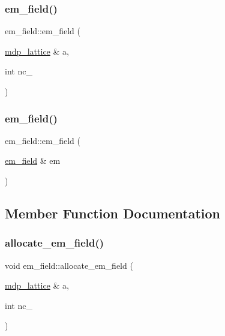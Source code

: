 \mbox{\label{classem__field_a15c0bc41753d8728c251f51b48e0f1ea}} 
\subsubsection{\texorpdfstring{em\+\_\+field()}{em\_field()}\hspace{0.1cm}{\footnotesize\ttfamily [2/3]}}
{\footnotesize\ttfamily em\+\_\+field\+::em\+\_\+field (\begin{DoxyParamCaption}\item[{\hyperlink{classmdp__lattice}{mdp\+\_\+lattice} \&}]{a,  }\item[{int}]{nc\+\_\+ }\end{DoxyParamCaption})\hspace{0.3cm}{\ttfamily [inline]}}

\mbox{\label{classem__field_ab061ffebdbd768362b56121237c1ac80}} 
\subsubsection{\texorpdfstring{em\+\_\+field()}{em\_field()}\hspace{0.1cm}{\footnotesize\ttfamily [3/3]}}
{\footnotesize\ttfamily em\+\_\+field\+::em\+\_\+field (\begin{DoxyParamCaption}\item[{\hyperlink{classem__field}{em\+\_\+field} \&}]{em }\end{DoxyParamCaption})\hspace{0.3cm}{\ttfamily [inline]}}



\subsection{Member Function Documentation}
\mbox{\label{classem__field_ae4f6727d2b31a8d7eec93bf3506c92fb}} 
\subsubsection{\texorpdfstring{allocate\+\_\+em\+\_\+field()}{allocate\_em\_field()}}
{\footnotesize\ttfamily void em\+\_\+field\+::allocate\+\_\+em\+\_\+field (\begin{DoxyParamCaption}\item[{\hyperlink{classmdp__lattice}{mdp\+\_\+lattice} \&}]{a,  }\item[{int}]{nc\+\_\+ }\end{DoxyParamCaption})\hspace{0.3cm}{\ttfamily [inline]}}

